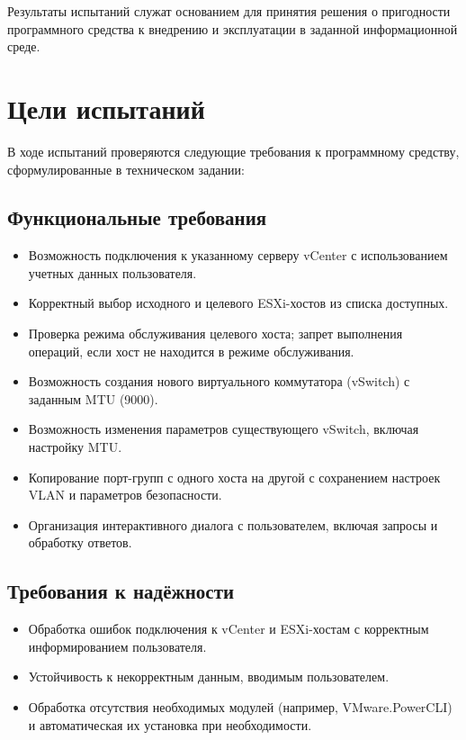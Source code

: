 Результаты испытаний служат основанием для принятия решения о пригодности программного средства к внедрению и эксплуатации в заданной информационной среде.

\newpage
\section{Цели испытаний}

В ходе испытаний проверяются следующие требования к программному средству, сформулированные в техническом задании:

\subsection{Функциональные требования}

\begin{itemize}
    \item Возможность подключения к указанному серверу vCenter с использованием учетных данных пользователя.
    \item Корректный выбор исходного и целевого ESXi-хостов из списка доступных.
    \item Проверка режима обслуживания целевого хоста; запрет выполнения операций, если хост не находится в режиме обслуживания.
    \item Возможность создания нового виртуального коммутатора (vSwitch) с заданным MTU (9000).
    \item Возможность изменения параметров существующего vSwitch, включая настройку MTU.
    \item Копирование порт-групп с одного хоста на другой с сохранением настроек VLAN и параметров безопасности.
    \item Организация интерактивного диалога с пользователем, включая запросы и обработку ответов.
\end{itemize}

\subsection{Требования к надёжности}

\begin{itemize}
    \item Обработка ошибок подключения к vCenter и ESXi-хостам с корректным информированием пользователя.
    \item Устойчивость к некорректным данным, вводимым пользователем.
    \item Обработка отсутствия необходимых модулей (например, VMware.PowerCLI) и автоматическая их установка при необходимости.
\end{itemize}

